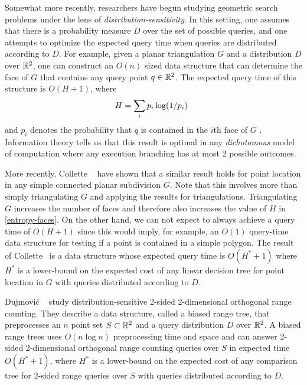 \documentclass{patmorin}
\begin{document}
Somewhat more recently, researchers have begun studying geometric
search problems under the lens of \emph{distribution-sensitivity}. In
this setting, one assumes that there is a probability measure $D$ over
the set of possible queries, and one attempts to optimize the expected
query time when queries are distributed according to $D$.  For example,
given a planar triangulation $G$ and a distribution $D$ over $\mathbb{R}^2$,
one can construct an $O(n)$ sized data structure that can determine
the face of $G$ that contains any query point $q\in\mathbb{R}^2$.  The expected
query time of this structure is $O(H+1)$, where
\begin{equation}
    H = \sum_{i} p_i\log (1/p_i)  \enspace  \eqlabel{entropy-faces}
\end{equation}
and $p_i$ denotes the probability that $q$ is contained in the $i$th face
of $G$ \cite{acmr00,amm00,amm01a,amm01b,ammw07,i01,i04}.  Information
theory tells us that this result is optimal in any \emph{dichotomous}
model of computation where any execution branching has at most 2 possible
outcomes.

More recently, Collette \etal\ \cite{cdilm08,cdilm09} have shown that a
similar result holds for point location in any simple connected planar
subdivision $G$.  Note that this involves more than simply triangulating
$G$ and applying the results for triangulations.  Triangulating $G$
increases the number of faces and therefore also increases the value of
$H$ in \eqref{entropy-faces}.  On the other hand, we can not expect to
always achieve a query time of $O(H+1)$ since this would imply, for
example, an $O(1)$ query-time data structure for testing if a point
is contained in a simple polygon.  The result of Collette \etal\  is
a data structure whose expected query time is $O(H^*+1)$ where $H^*$
is a lower-bound on the expected cost of any linear decision tree for
point location in $G$ with queries distributed according to $D$.

Dujmovi\'c \etal\ \cite{dhm09} study distribution-sensitive 2-sided
2-dimensional orthogonal range counting.  They describe a data
structure, called a biased range tree, that preprocesses an $n$ point
set $S\subset\mathbb{R}^2$ and a query distribution $D$ over $\mathbb{R}^2$.  A biased
range trees uses $O(n\log n)$ preprocessing time and space and can
answer 2-sided 2-dimensional orthogonal range counting queries over
$S$ in expected time $O(H^*+1)$, where $H^*$ is a lower-bound on the
expected cost of any comparison tree for 2-sided range queries over $S$
with queries distributed according to $D$.
\end{document}
